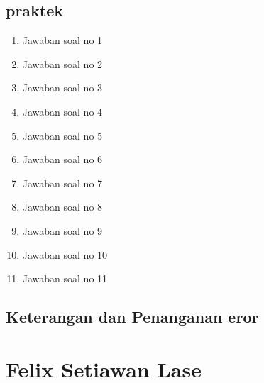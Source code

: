 \subsection{praktek}
\begin{enumerate}
	\item Jawaban soal no 1
	
	\item Jawaban soal no 2
	
	\item Jawaban soal no 3
	
	\item Jawaban soal no 4
	
	\item Jawaban soal no 5
	
	\item Jawaban soal no 6
	
	\item Jawaban soal no 7
	
	\item Jawaban soal no 8
	
	\item Jawaban soal no 9
	
	\item Jawaban soal no 10
	
	\item Jawaban soal no 11
	
\end{enumerate}

\subsection{Keterangan dan Penanganan eror}

\section{Felix Setiawan Lase}
